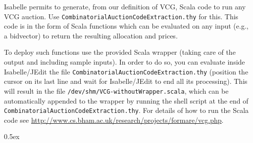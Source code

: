 \documentclass[11pt,a4paper]{article}
\begin{document}
Isabelle permits to generate, from our definition of VCG, Scala code
to run any VCG auction.  Use
\texttt{CombinatorialAuctionCodeExtraction.thy} for this. This code is
in the form of Scala functions which can be evaluated on any input
(e.g., a bidvector) to return the resulting allocation and prices.

To deploy such functions use the provided Scala
wrapper (taking care of the output and including sample inputs).  In
order to do so, you can evaluate inside Isabelle/JEdit the file
\texttt{CombinatorialAuctionCodeExtraction.thy} (position the cursor on its
last line and wait for Isabelle/JEdit to end all its processing).
This will result in the file
\texttt{/dev/shm/VCG-withoutWrapper.scala}, which can be automatically
appended to the wrapper by running the shell script at
the end of \texttt{CombinatorialAuctionCodeExtraction.thy}. For details of how to run the Scala code see
\url{http://www.cs.bham.ac.uk/research/projects/formare/vcg.php}.


\parindent 0pt\parskip 0.5ex





\end{document}
